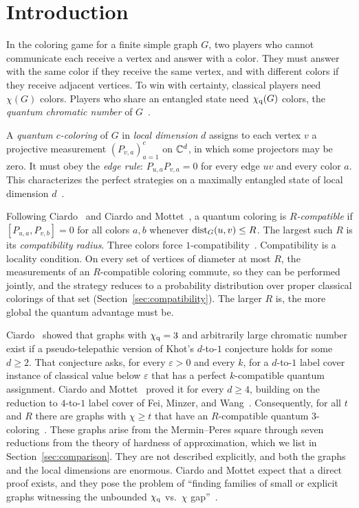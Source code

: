 \section{Introduction}\label{sec:introduction}

In the coloring game for a finite simple graph $G$, two players who cannot communicate each receive a vertex and answer with a color. They must answer with the same color if they receive the same vertex, and with different colors if they receive adjacent vertices. To win with certainty, classical players need $\chi(G)$ colors. Players who share an entangled state need $\chi_{\mathrm q}(G)$ colors, the \emph{quantum chromatic number} of $G$~\cite{GW,CMNSW}.

A \emph{quantum $c$-coloring} of $G$ in \emph{local dimension} $d$ assigns to each vertex $v$ a projective measurement $(P_{v,a})_{a=1}^c$ on $\mathbb C^d$, in which some projectors may be zero. It must obey the \emph{edge rule}: $P_{u,a}P_{v,a}=0$ for every edge $uv$ and every color $a$. This characterizes the perfect strategies on a maximally entangled state of local dimension $d$~\cite[Corollary~2.2]{MR}.

Following Ciardo~\cite[Section~3]{C26} and Ciardo and Mottet~\cite[Section~4.1]{CM}, a quantum coloring is \emph{$R$-compatible} if $[P_{u,a},P_{v,b}]=0$ for all colors $a,b$ whenever $\operatorname{dist}_G(u,v)\le R$. The largest such $R$ is its \emph{compatibility radius}. Three colors force $1$-compatibility~\cite[Lemma~2]{Ji}. Compatibility is a locality condition. On every set of vertices of diameter at most $R$, the measurements of an $R$-compatible coloring commute, so they can be performed jointly, and the strategy reduces to a probability distribution over proper classical colorings of that set (Section~\ref{sec:compatibility}). The larger $R$ is, the more global the quantum advantage must be.

Ciardo~\cite[Conjecture~2 and Theorem~7]{C26} showed that graphs with $\chi_{\mathrm q}=3$ and arbitrarily large chromatic number exist if a pseudo-telepathic version of Khot's $d$-to-$1$ conjecture holds for some $d\ge2$. That conjecture asks, for every $\varepsilon>0$ and every $k$, for a $d$-to-$1$ label cover instance of classical value below $\varepsilon$ that has a perfect $k$-compatible quantum assignment. Ciardo and Mottet~\cite[Theorem~1.3]{CM} proved it for every $d\ge4$, building on the reduction to $4$-to-$1$ label cover of Fei, Minzer, and Wang~\cite{FMW}. Consequently, for all $t$ and $R$ there are graphs with $\chi\ge t$ that have an $R$-compatible quantum $3$-coloring~\cite[Theorem~1.4 and Remark~2.5]{CM}. These graphs arise from the Mermin--Peres square through seven reductions from the theory of hardness of approximation, which we list in Section~\ref{sec:comparison}. They are not described explicitly, and both the graphs and the local dimensions are enormous. Ciardo and Mottet expect that a direct proof exists, and they pose the problem of ``finding families of small or explicit graphs witnessing the unbounded $\chi_{\mathrm q}$ vs.\ $\chi$ gap''~\cite[Section~3]{CM}.

